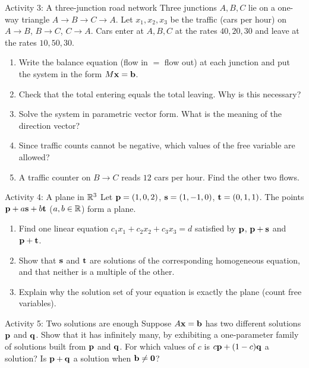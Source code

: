 \documentclass[11pt]{article}
\begin{document}
\begin{ext}{Activity 3: A three-junction road network}{}
Three junctions $A,B,C$ lie on a one-way triangle $A\to B\to C\to A$. Let $x_1,x_2,x_3$ be the traffic (cars per hour) on $A\to B$, $B\to C$, $C\to A$. Cars enter at $A,B,C$ at the rates $40,20,30$ and leave at the rates $10,50,30$.
\begin{enumerate}[label=(\alph*),itemsep=6pt]
  \item Write the balance equation (flow in $=$ flow out) at each junction and put the system in the form $M\mathbf{x}=\mathbf{b}$.
  \item Check that the total entering equals the total leaving. Why is this necessary?
  \item Solve the system in parametric vector form. What is the meaning of the direction vector?
  \item Since traffic counts cannot be negative, which values of the free variable are allowed?
  \item A traffic counter on $B\to C$ reads $12$ cars per hour. Find the other two flows.
\end{enumerate}
\workspace{1.8in}
\end{ext}

\begin{ext}{Activity 4: A plane in $\mathbb{R}^3$}{}
Let $\mathbf{p}=(1,0,2)$, $\mathbf{s}=(1,-1,0)$, $\mathbf{t}=(0,1,1)$. The points $\mathbf{p}+a\mathbf{s}+b\mathbf{t}$ ($a,b\in\mathbb{R}$) form a plane.
\begin{enumerate}[label=(\alph*),itemsep=6pt]
  \item Find one linear equation $c_1x_1+c_2x_2+c_3x_3=d$ satisfied by $\mathbf{p}$, $\mathbf{p}+\mathbf{s}$ and $\mathbf{p}+\mathbf{t}$.
  \item Show that $\mathbf{s}$ and $\mathbf{t}$ are solutions of the corresponding homogeneous equation, and that neither is a multiple of the other.
  \item Explain why the solution set of your equation is exactly the plane (count free variables).
\end{enumerate}
\workspace{1.8in}
\end{ext}

\begin{ext}{Activity 5: Two solutions are enough}{}
Suppose $A\mathbf{x}=\mathbf{b}$ has two different solutions $\mathbf{p}$ and $\mathbf{q}$. Show that it has infinitely many, by exhibiting a one-parameter family of solutions built from $\mathbf{p}$ and $\mathbf{q}$. For which values of $c$ is $c\mathbf{p}+(1-c)\mathbf{q}$ a solution? Is $\mathbf{p}+\mathbf{q}$ a solution when $\mathbf{b}\neq\mathbf{0}$?
\workspace{1.6in}
\end{ext}
\end{document}
